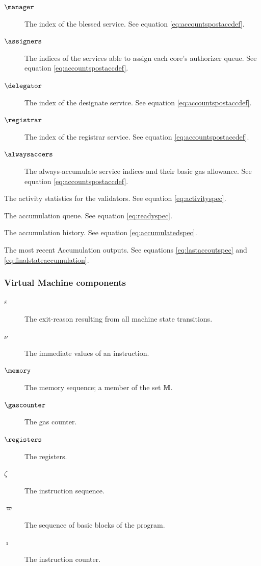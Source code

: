 \begin{description}
\begin{description}
    \item[$\manager$] The index of the blessed service. See equation \ref{eq:accountspostaccdef}.
    \item[$\assigners$] The indices of the services able to assign each core's authorizer queue. See equation \ref{eq:accountspostaccdef}.
    \item[$\delegator$] The index of the designate service. See equation \ref{eq:accountspostaccdef}.
    \item[$\registrar$] The index of the registrar service. See equation \ref{eq:accountspostaccdef}.
    \item[$\alwaysaccers$] The always-accumulate service indices and their basic gas allowance. See equation \ref{eq:accountspostaccdef}.
  \end{description}
  \item[$\activity$] The activity statistics for the validators. See equation \ref{eq:activityspec}.
  \item[$\ready$] The accumulation queue. See equation \ref{eq:readyspec}.
  \item[$\accumulated$] The accumulation history. See equation \ref{eq:accumulatedspec}.
  \item[$\lastaccout$] The most recent Accumulation outputs. See equations \ref{eq:lastaccoutspec} and \ref{eq:finalstateaccumulation}.
\end{description}

\subsubsection{Virtual Machine components}

\begin{description}
  \item[$\varepsilon$] The exit-reason resulting from all machine state transitions.
  \item[$\nu$] The immediate values of an instruction.
  \item[$\memory$] The memory sequence; a member of the set $\mathbb{M}$.
  \item[$\gascounter$] The gas counter.
  \item[$\registers$] The registers.
  \item[$\zeta$] The instruction sequence.
  \item[$\varpi$] The sequence of basic blocks of the program.
  \item[$\imath$] The instruction counter.
\end{description}

